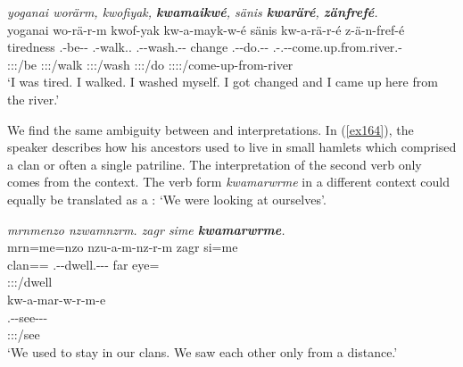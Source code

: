 \begin{exe}
	\ex \emph{yoganai worärm, kwofiyak, \textbf{kwamaikwé}, sänis \textbf{kwaräré}, \textbf{zänfrefé}.}\\
	\glll yoganai wo-rä-r-m kwof-yak kw-a-mayk-w-é sänis kw-a-rä-r-é z-ä-n-fref-é\\
	tiredness \Fsg.\Alph-be-\Lk-\Dur{} \Fsg.\Betatwo-walk.\Ext.\Ndu{} \M.\Betaone-\Vc-wash.\Ext-\Ndu-\Fsg{} change \M.\Betaone-\Vc-do.\Ext-\Lk-\Fsg{} \M.\Gam-\Vc.\Ndu-\Venit-come.up.from.river.\Rs-\Fsg\\
	{} \footnotesize{\Fsg:\Sbj:\Rpst:\Dur/be} \footnotesize{\Fsg:\Sbj:\Rpst:\Ipfv/walk} \footnotesize{\Fsg:\Sbj:\Rpst:\Ipfv/wash} {} \footnotesize{\Fsg:\Sbj:\Rpst:\Ipfv/do} \footnotesize{\Fsg:\Sbj:\Rpst:\Pfv:\Venit/come-up-from-river}\\
	\trans `I was tired. I walked. I washed myself. I got changed and I came up here from the river.' 
	\label{ex163}
\end{exe}

We find the same ambiguity between  and  interpretations. In (\ref{ex164}), the speaker describes how his ancestors used to live in small hamlets which comprised a clan or often a single patriline. The  interpretation of the second verb only comes from the context. The verb form \emph{kwamarwrme} in a different context could equally be translated as a : `We were looking at ourselves'.

\begin{exe}
	\ex \emph{mrnmenzo nzwamnzrm. zagr sime \textbf{kwamarwrme}.}\\
	\glll mrn=me=nzo nzu-a-m-nz-r-m zagr si=me\\
	clan=\Ins=\Only{} \Fnsg.\Betaone-\Vc-dwell.\Ext-\Ndu-\Lk-\Dur{} far eye=\Ins{}\\
	{} \footnotesize{\Fpl:\Sbj:\Pst:\Dur/dwell} {} {}\\
	\sn
	\glll kw-a-mar-w-r-m-e\\
	\M.\Betaone-\Vc-see-\Lk-\Dur-\Fnsg\\
	\footnotesize{\Fpl:\Sbj:\Pst:\Dur/see}\\
	\trans `We used to stay in our clans. We saw each other only from a distance.'\\ 
	\label{ex164}
\end{exe}

